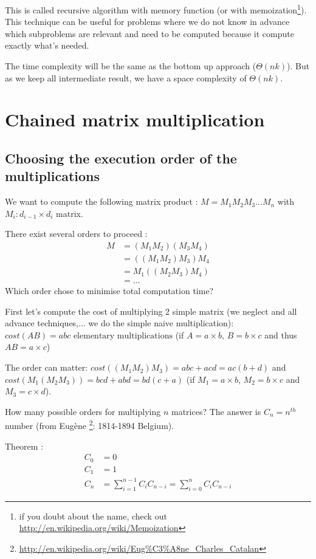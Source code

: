 This is called recursive algorithm with memory function (or with memoization\footnote{if you doubt about the name, check out \url{http://en.wikipedia.org/wiki/Memoization}}). This technique can be useful for problems where we do not know in advance which subproblems are relevant and need to be computed because it compute exactly what's needed.

The time complexity will be the same as the bottom up approach ($\Theta (nk)$). But as we keep all intermediate result, we have a space complexity of $\Theta (nk)$. 

\section{Chained matrix multiplication}

\subsection{Choosing the execution order of the multiplications}

We want to compute the following matrix product : $ M = M_1M_2M_3...M_n$ with $M_i:d_{i-1}\times d_{i}$ matrix.

There exist several orders to proceed :
\begin{align*}
M&=(M_1M_2)(M_3M_4)\\
 &= ((M_1M_2)M_3)M_4\\ 
 &= M_1((M_2M_3)M_4)\\
 &=...
\end{align*}
Which order chose to minimise total computation time?

First let's compute the cost of multiplying 2 simple matrix (we neglect  and all advance techniques,... we do the simple naive multiplication):\\
$cost(AB) = abc\text{ elementary multiplications}$ (if $A=a\times b$, $B=b\times c$ and thus $AB = a\times c$)

The order can matter: $cost((M_1M_2)M_3) = abc+acd = ac(b+d)$ and $cost(M_1(M_2M_3)) = bcd + abd=bd(c+a)$ (if $M_1=a\times b$, $M_2=b\times c$ and $M_3 = c\times d$).

How many possible orders for multiplying $n$ matrices?
The answer is $C_n = n^{th}$ number
(from Eugène \footnote{\url{http://en.wikipedia.org/wiki/Eug\%C3\%A8ne_Charles_Catalan}}: 1814-1894 Belgium).

\begin{theorem}\label{cm4:valC}
Theorem :
\begin{align*}
C_0 &=0\\
C_1 &=1\\
C_n &= \sum_{i=1}^{n-1} C_iC_{n-i} = \sum_{i=0}^{n}C_iC_{n-i}
\end{align*}
\end{theorem}

